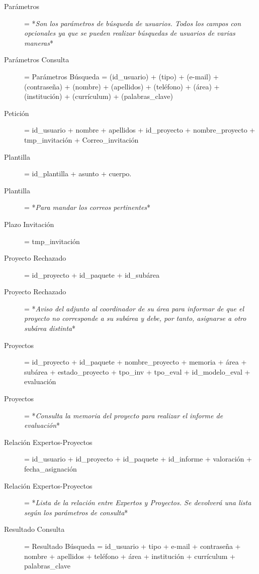\documentclass[12pt,a4paper,titlepage,spanish,twoside]{book}
\begin{document}
\begin{description}
\item[Parámetros] = *\emph{Son los parámetros de búsqueda de usuarios. Todos
    los campos con opcionales ya que se pueden realizar búsquedas de usuarios
    de varias maneras}* 

\item[Parámetros Consulta] = Parámetros Búsqueda = (id\_usuario) + (tipo) +
  (e-mail) + (contraseña) + (nombre) + (apellidos) + (teléfono) + (área) +
  (institución) + (currículum) + (palabras\_clave) 

\item[Petición] = id\_usuario + nombre + apellidos + id\_proyecto +
  nombre\_proyecto + tmp\_invitación + Correo\_invitación 

\item[Plantilla] = id\_plantilla + asunto + cuerpo.

\item[Plantilla] = *\emph{Para mandar los correos pertinentes}*

\item[Plazo Invitación] = tmp\_invitación

\item[Proyecto Rechazado] = id\_proyecto + id\_paquete + id\_subárea

\item[Proyecto Rechazado] = *\emph{Aviso del adjunto al coordinador de su
    área para informar de que el proyecto no corresponde a su subárea y debe,
    por tanto, asignarse a otro subárea distinta}* 

\item[Proyectos] = id\_proyecto + id\_paquete + nombre\_proyecto + memoria +
  área + subárea + estado\_proyecto + tpo\_inv + tpo\_eval + id\_modelo\_eval
  + evaluación 

\item[Proyectos] = *\emph{Consulta la memoria del proyecto para realizar el
    informe de evaluación}* 

\item[Relación Expertos-Proyectos] = {id\_usuario + id\_proyecto +
    id\_paquete + id\_informe + valoración + fecha\_asignación} 

\item[Relación Expertos-Proyectos] = *\emph{Lista de la relación entre
    Expertos y Proyectos. Se devolverá una lista según los parámetros de
    consulta}* 

\item[Resultado Consulta] = Resultado Búsqueda = {id\_usuario + tipo +
    e-mail + contraseña + nombre + apellidos + teléfono + área + institución
    + currículum + {palabras\_clave}} 


\end{description}
\end{document}
